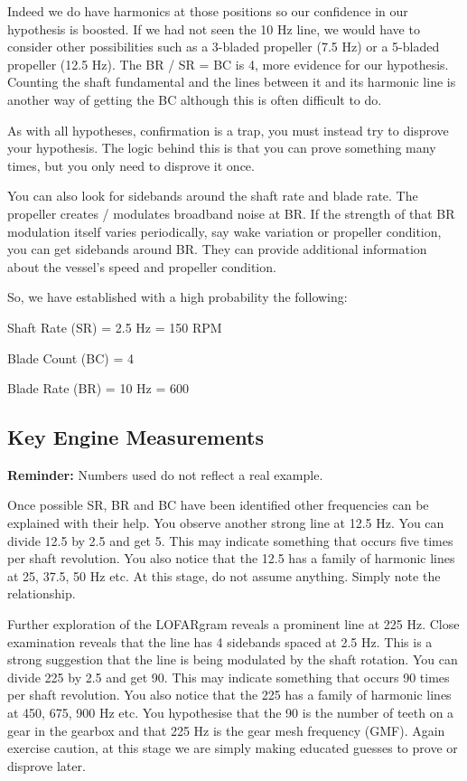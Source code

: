 Indeed we do have harmonics at those positions so our confidence in our hypothesis is boosted. If we had not seen the 10 Hz line, we would have to consider other possibilities such as a 3-bladed propeller (7.5 Hz) or a 5-bladed propeller (12.5 Hz). The BR / SR = BC is 4, more evidence for our hypothesis. Counting the shaft fundamental and the lines between it and its harmonic line is another way of getting the BC although this is often difficult to do.

\begin{learnpoint}
    As with all hypotheses, confirmation is a trap, you must instead try to disprove your hypothesis. The logic behind this is that you can prove something many times, but you only need to disprove it once.
\end{learnpoint}

You can also look for sidebands around the shaft rate and blade rate. The propeller creates / modulates broadband noise at BR. If the strength of that BR modulation itself varies periodically, say wake variation or propeller condition, you can get sidebands around BR. They can provide additional information about the vessel's speed and propeller condition.

So, we have established with a high probability the following:

\begin{compactitem}
    \item Shaft Rate (SR) = 2.5 Hz = 150 RPM
    \item Blade Count (BC) = 4
    \item Blade Rate (BR) = 10 Hz = 600
\end{compactitem}

\subsection{Key Engine Measurements}

\textbf{Reminder:} Numbers used do not reflect a real example.

Once possible SR, BR and BC have been identified other frequencies can be explained with their help. You observe another strong line at 12.5 Hz. You can divide 12.5 by 2.5 and get 5. This may indicate something that occurs five times per shaft revolution. You also notice that the 12.5 has a family of harmonic lines at 25, 37.5, 50 Hz etc. At this stage, do not assume anything. Simply note the relationship.

Further exploration of the LOFARgram reveals a prominent line at 225 Hz. Close examination reveals that the line has 4 sidebands spaced at 2.5 Hz. This is a strong suggestion that the line is being modulated by the shaft rotation. You can divide 225 by 2.5 and get 90. This may indicate something that occurs 90 times per shaft revolution. You also notice that the 225 has a family of harmonic lines at 450, 675, 900 Hz etc. You hypothesise that the 90 is the number of teeth on a gear in the gearbox and that 225 Hz is the gear mesh frequency (GMF). Again exercise caution, at this stage we are simply making educated guesses to prove or disprove later.

